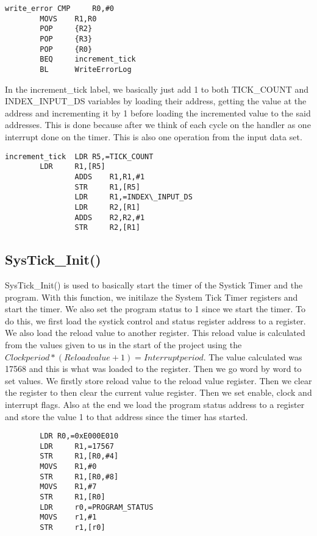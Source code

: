 \documentclass[pdftex,12pt,a4paper]{article}
\begin{document}
\begin{lstlisting}
write_error	CMP     R0,#0						
		MOVS    R1,R0					
		POP     {R2}					
		POP     {R3}						
		POP     {R0}					
		BEQ     increment_tick			 
		BL      WriteErrorLog				
\end{lstlisting}
				
In the increment\_tick label, we basically just add 1 to both TICK\_COUNT and INDEX\_INPUT\_DS	variables by loading their address, getting the value at the address and incrementing it by 1 before loading the incremented value to the said addresses. This is done because after we think of each cycle on the handler as one interrupt done on the timer. This is also one operation from the input data set.

\begin{lstlisting}
increment_tick	LDR	R5,=TICK_COUNT				
		LDR     R1,[R5]					
                ADDS    R1,R1,#1					
                STR     R1,[R5]					
                LDR     R1,=INDEX\_INPUT_DS		
                LDR     R2,[R1]					
                ADDS    R2,R2,#1				
                STR     R2,[R1]	
\end{lstlisting}

\subsection{SysTick\_Init()}

SysTick\_Init() is used to basically start the timer of the Systick Timer and the program. With this function, we initilaze the System Tick Timer registers and start the timer. We also set the program status to 1 since we start the timer.
To do this, we first load the systick control and status register address to a register. We also load the reload value to another register. This reload value is calculated from the values given to us in the start of the project using the $Clock period* (Reload value + 1) = Interrupt period$. The value calculated was 17568 and this is what was loaded to the register. Then we go word by word to set values. We firstly store reload value to the reload value register. Then we clear the register to then clear the current value register. Then we set enable, clock and interrupt flags. Also at the end we load the program status address to a register and store the value 1 to that address since the timer has started.

\begin{lstlisting}
        LDR	R0,=0xE000E010 						
        LDR     R1,=17567							
        STR     R1,[R0,#4]							
        MOVS    R1,#0							
        STR     R1,[R0,#8]							
        MOVS    R1,#7							
        STR     R1,[R0]							
        LDR     r0,=PROGRAM_STATUS				
        MOVS    r1,#1							
        STR     r1,[r0]							
\end{lstlisting}
\end{document}
